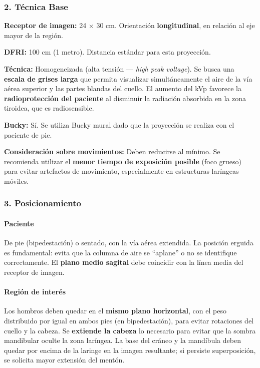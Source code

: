 	\subsubsection*{2. Técnica Base}
	
	\textbf{Receptor de imagen:} 24 $\times$ 30 cm. Orientación \textbf{longitudinal}, en relación al eje mayor de la región.
	
	\textbf{DFRI:} 100 cm (1 metro). Distancia estándar para esta proyección.
	
	\textbf{Técnica:} Homogeneizada (alta tensión --- \textit{high peak voltage}). Se busca una \textbf{escala de grises larga} que permita visualizar simultáneamente el aire de la vía aérea superior y las partes blandas del cuello. El aumento del kVp favorece la \textbf{radioprotección del paciente} al disminuir la radiación absorbida en la zona tiroidea, que es radiosensible.
	
	\textbf{Bucky:} Sí. Se utiliza Bucky mural dado que la proyección se realiza con el paciente de pie.
	
	\textbf{Consideración sobre movimientos:} Deben reducirse al mínimo. Se recomienda utilizar el \textbf{menor tiempo de exposición posible} (foco grueso) para evitar artefactos de movimiento, especialmente en estructuras laríngeas móviles.
	
	\subsubsection*{3. Posicionamiento}
	
	\paragraph{Paciente}
	De pie (bipedestación) o sentado, con la vía aérea extendida. La posición erguida es fundamental: evita que la columna de aire se ``aplane'' o no se identifique correctamente. El \textbf{plano medio sagital} debe coincidir con la línea media del receptor de imagen.
	
	\paragraph{Región de interés}
	Los hombros deben quedar en el \textbf{mismo plano horizontal}, con el peso distribuido por igual en ambos pies (en bipedestación), para evitar rotaciones del cuello y la cabeza. Se \textbf{extiende la cabeza} lo necesario para evitar que la sombra mandibular oculte la zona laríngea. La base del cráneo y la mandíbula deben quedar por encima de la laringe en la imagen resultante; si persiste superposición, se solicita mayor extensión del mentón.
	
